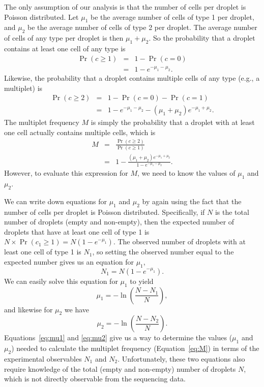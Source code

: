 \documentclass[fleqn,10pt,lineno]{wlpeerj} %
\begin{document}
The only assumption of our analysis is that the number of cells per droplet is Poisson distributed.
Let $\mu_1$ be the average number of cells of type 1 per droplet, and $\mu_2$ be the average number of cells of type 2 per droplet.
The average number of cells of any type per droplet is then $\mu_1 + \mu_2$.
So the probability that a droplet contains at least one cell of any type is
\begin{eqnarray}
\label{eq:Pr1}
\Pr\left(c \ge 1\right) &=& 1 - \Pr\left(c = 0 \right) \nonumber \\
&=& 1 - e^{-\mu_1 - \mu_2}.
\end{eqnarray}
Likewise, the probability that a droplet contains multiple cells of any type (e.g., a multiplet) is
\begin{eqnarray}
\label{eq:Pr2}
\Pr\left(c \ge 2\right) &=& 1 - \Pr\left(c = 0\right) - \Pr\left(c = 1\right) \nonumber \\
&=& 1 - e^{-\mu_1 - \mu_2} - \left(\mu_1 + \mu_2\right) e^{-\mu_1 + \mu_2}.
\end{eqnarray}
The multiplet frequency $M$ is simply the probability that a droplet with at least one cell actually contains multiple cells, which is
\begin{eqnarray}
\label{eq:M}
M &=& \frac{\Pr\left(c \ge 2\right)}{\Pr\left(c \ge 1\right)} \nonumber \\
&=& 1 - \frac{\left(\mu_1 + \mu_2\right) e^{-\mu_1 + \mu_2}}{1 - e^{-\mu_1 - \mu_2}}.
\end{eqnarray}
However, to evaluate this expression for $M$, we need to know the values of $\mu_1$ and $\mu_2$.

We can write down equations for $\mu_1$ and $\mu_2$ by again using the fact that the number of cells per droplet is Poisson distributed.
Specifically, if $N$ is the total number of droplets (empty and non-empty), then the expected number of droplets that have at least one cell of type 1 is $N \times \Pr\left(c_1 \ge 1\right) = N \left(1 - e^{-\mu_1}\right)$.
The observed number of droplets with at least one cell of type 1 is $N_1$, so setting the observed number equal to the expected number gives us an equation for $\mu_1$,
\begin{equation}
N_1 = N \left(1 - e^{-\mu_1}\right).
\end{equation}
We can easily solve this equation for $\mu_1$ to yield
\begin{equation}
\label{eq:mu1}
\mu_1 = -\ln\left(\frac{N - N_1}{N}\right),
\end{equation}
and likewise for $\mu_2$ we have
\begin{equation}
\label{eq:mu2}
\mu_2 = -\ln\left(\frac{N - N_2}{N}\right).
\end{equation}
Equations~\ref{eq:mu1} and \ref{eq:mu2} give us a way to determine the values ($\mu_1$ and $\mu_2$) needed to calculate the multiplet frequency (Equation~\ref{eq:M}) in terms of the experimental observables $N_1$ and $N_2$.
Unfortunately, these two equations also require knowledge of the total (empty and non-empty) number of droplets $N$, which is not directly observable from the sequencing data.
\end{document}
